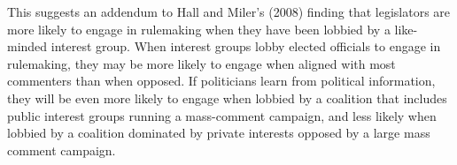 This suggests an addendum to Hall and Miler's (2008) finding that legislators are more likely to engage in rulemaking when they have been lobbied by a like-minded interest group.
When interest groups lobby elected officials to engage in rulemaking, they may be more likely to engage when aligned with most commenters than when opposed.
If politicians learn from political information, they will be even more likely to engage when lobbied by a coalition that includes public interest groups running a mass-comment campaign, and less likely when lobbied by a coalition dominated by private interests opposed by a large mass comment campaign. 






